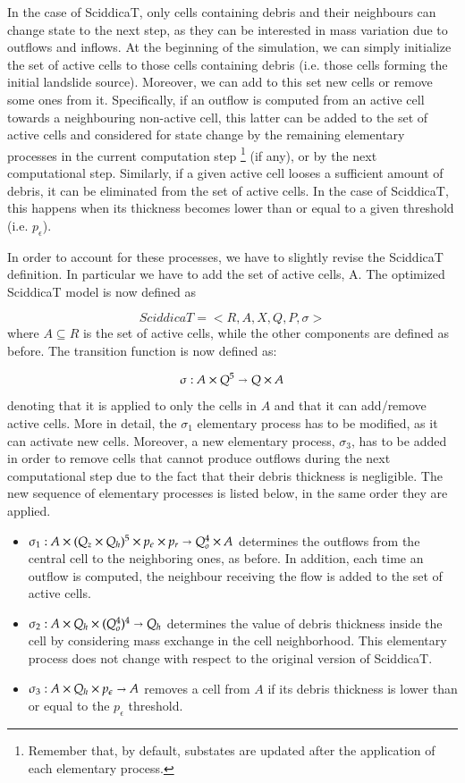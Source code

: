 In the case of SciddicaT, only cells containing debris and their
neighbours can change state to the next step, as they can be
interested in mass variation due to outflows and inflows. At the
beginning of the simulation, we can simply initialize the set of
active cells to those cells containing debris (i.e. those cells
forming the initial landslide source). Moreover, we can add to this
set new cells or remove some ones from it. Specifically, if an outflow
is computed from an active cell towards a neighbouring non-active
cell, this latter can be added to the set of active cells and
considered for state change by the remaining elementary processes in
the current computation step \footnote{Remember that, by default,
  substates are updated after the application of each elementary
  process.} (if any), or by the next computational step. Similarly, if
a given active cell looses a sufficient amount of debris, it can be
eliminated from the set of active cells. In the case of SciddicaT,
this happens when its thickness becomes lower than or equal to a given
threshold (i.e. $p_\epsilon$).

In order to account for these processes, we have to slightly revise
the SciddicaT definition. In particular we have to add the set of
active cells, A. The optimized SciddicaT model is now defined as

$$SciddicaT = < R, A, X, Q , P, \sigma >$$
where $A \subseteq R$ is the set of active cells, while the other
components are defined as before. The transition function is now defined as:

$$\sigma : A \times Q^5 \shortrightarrow Q \times A$$ denoting that it
is applied to only the cells in $A$ and that it can add/remove active
cells. More in detail, the $\sigma_1$ elementary process has to be
modified, as it can activate new cells. Moreover, a new elementary
process, $\sigma_3$, has to be added in order to remove cells that
cannot produce outflows during the next computational step due to the
fact that their debris thickness is negligible. The new sequence of
elementary processes is listed below, in the same order they are
applied.

\begin{itemize}
\item $\sigma_1 : A \times (Q_z \times Q_h)^5 \times p_\epsilon \times p_r
  \shortrightarrow Q_o^4 \times A$ determines the outflows from the
  central cell to the neighboring ones, as before. In addition, each
  time an outflow is computed, the neighbour receiving the flow is
  added to the set of active cells.

\item $\sigma_2: A \times Q_h \times (Q_o^4)^4 \shortrightarrow Q_h$ determines
  the value of debris thickness inside the cell by considering mass
  exchange in the cell neighborhood. This elementary process does not
  change with respect to the original version of SciddicaT.

\item $\sigma_3: A \times Q_h \times p_\epsilon \shortrightarrow A$
  removes a cell from $A$ if its debris thickness is lower than or
  equal to the $p_\epsilon$ threshold.
\end{itemize}

